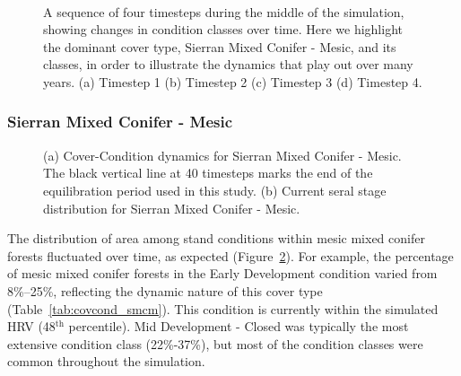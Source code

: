 \begin{figure}[!htbp]
  \centering
  \\%
  \caption{A sequence of four timesteps during the middle of the simulation, showing changes in condition classes over time. Here we highlight the dominant cover type, Sierran Mixed Conifer - Mesic, and its classes, in order to illustrate the dynamics that play out over many years. (a) Timestep 1 (b) Timestep 2 (c) Timestep 3 (d) Timestep 4.}
  \label{fig:covcondmaps}
\end{figure}



\subsubsection{Sierran Mixed Conifer - Mesic}

\begin{figure}[!htbp]
  \centering
  \caption{(a) Cover-Condition dynamics for Sierran Mixed Conifer - Mesic. The black vertical line at 40 timesteps marks the end of the equilibration period used in this study. (b) Current seral stage distribution for Sierran Mixed Conifer - Mesic.} 
  \label{fig:covcond_smcm}
\end{figure}

The distribution of area among stand conditions within mesic mixed conifer forests fluctuated over time, as expected (Figure~\ref{fig:covcond_smcm}). For example, the percentage of mesic mixed conifer forests in the Early Development condition varied from 8\%--25\%, reflecting the dynamic nature of this cover type (Table~\ref{tab:covcond_smcm}). This condition is currently within the simulated HRV (48$^{\text{th}}$ percentile). Mid Development - Closed was typically the most extensive condition class (22\%-37\%), but most of the condition classes were common throughout the simulation. %

